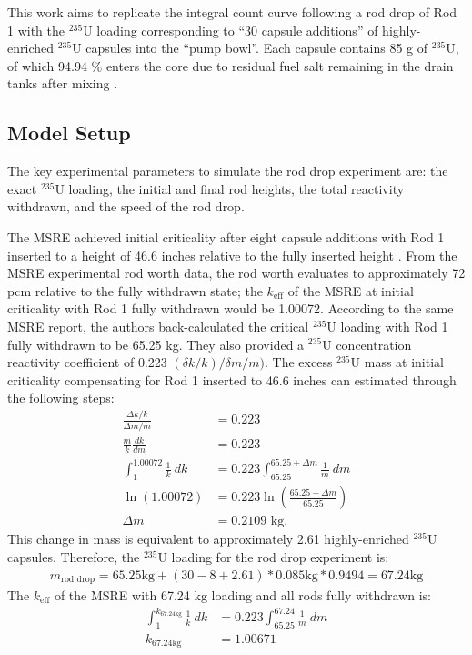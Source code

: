 This work aims to replicate the integral count curve following a rod drop of Rod 1 with the
$^{235}$U loading corresponding to ``30 capsule additions'' of highly-enriched $^{235}$U capsules
into the ``pump bowl''. Each capsule contains 85 g of $^{235}$U, of which 94.94 \% enters the core
due to residual fuel salt remaining in the drain tanks after mixing \cite{fratoni_molten_2020}.

\subsection{Model Setup} \label{sec:rod-drop-setup}

The key experimental parameters to simulate the rod drop experiment are: the exact $^{235}$U
loading, the initial and final rod heights, the total reactivity withdrawn, and the speed of the
rod drop.

The \gls{MSRE} achieved initial criticality after eight capsule additions with Rod 1 inserted to a
height of 46.6 inches relative to the fully inserted height \cite{prince_zero-power_1968}.
From the \gls{MSRE} experimental rod worth
data, the rod worth evaluates to approximately 72 pcm relative to the fully withdrawn state; the
$k_\text{eff}$ of the \gls{MSRE} at initial criticality with Rod 1 fully withdrawn would be
1.00072. According to the same \gls{MSRE} report, the
authors back-calculated the critical $^{235}$U loading with Rod 1 fully withdrawn to be 65.25 kg.
They also provided a $^{235}$U concentration reactivity coefficient of 0.223 $(\delta k/k)/\delta m
/m)$. The excess $^{235}$U mass at initial criticality compensating for Rod 1 inserted to 46.6
inches can estimated through the following steps:
%
\begin{align}
  \frac{\Delta k / k}{\Delta m / m} &= 0.223 \nonumber \\
  \frac{m}{k}\frac{dk}{dm} &= 0.223 \nonumber \\
  \int^{1.00072}_1 \frac{1}{k}\ dk &= 0.223 \int^{65.25+\Delta m}_{65.25} \frac{1}{m}\ dm \nonumber \\
  \ln \left(1.00072\right) &= 0.223 \ln\left(\frac{65.25+\Delta m}{65.25}\right) \nonumber \\
  \Delta m &= 0.2109 \mbox{ kg}.
\end{align}
%
This change in mass is equivalent to approximately 2.61 highly-enriched $^{235}$U capsules.
Therefore, the $^{235}$U loading for the rod drop experiment is:
%
\begin{gather}
  m_\text{rod drop} = 65.25 \text{kg} + (30 - 8 + 2.61) * 0.085 \text{kg} * 0.9494 = 67.24 \text{kg}
\end{gather}
%
The $k_\text{eff}$ of the \gls{MSRE} with 67.24 kg loading and all rods fully withdrawn is:
%
\begin{align}
  \int^{k_{67.24 \text{kg}}}_1 \frac{1}{k}\ dk &= 0.223 \int^{67.24}_{65.25} \frac{1}{m}\ dm \nonumber \\
    k_{67.24 \text{kg}} &= 1.00671
\end{align}

